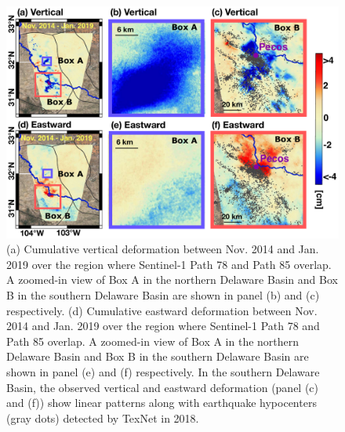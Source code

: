 \begin{figure}
	\centering
	\includegraphics[width=0.96\linewidth]{figures/chapter4-grl/figure4-east-vertical-6panel-labelled-small.pdf}
	\caption[Cumulative vertical and horizontal deformation]{(a) Cumulative vertical deformation between Nov. 2014 and Jan. 2019 over the region where Sentinel-1 Path 78 and Path 85 overlap. A zoomed-in view of Box A in the northern Delaware Basin and Box B in the southern Delaware Basin are shown in panel (b) and (c) respectively. (d) Cumulative eastward deformation between Nov. 2014 and Jan. 2019 over the region where Sentinel-1 Path 78 and Path 85 overlap. A zoomed-in view of Box A in the northern Delaware Basin and Box B in the southern Delaware Basin are shown in panel (e) and (f) respectively. In the southern Delaware Basin, the observed vertical and eastward deformation (panel (c) and (f)) show linear patterns along with earthquake hypocenters (gray dots) detected by TexNet in 2018.}
	\label{fig:ch4-insar-decomp}
\end{figure}

\FloatBarrier

